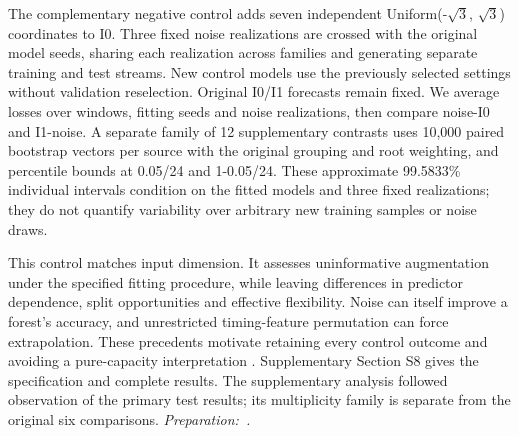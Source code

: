 The complementary negative control adds seven independent Uniform(-\(\sqrt{3}\), \(\sqrt{3}\)) coordinates to I0. Three fixed noise realizations are crossed with the original model seeds, sharing each realization across families and generating separate training and test streams. New control models use the previously selected settings without validation reselection. Original I0/I1 forecasts remain fixed. We average losses over windows, fitting seeds and noise realizations, then compare noise-I0 and I1-noise. A separate family of 12 supplementary contrasts uses 10,000 paired bootstrap vectors per source with the original grouping and root weighting, and percentile bounds at 0.05/24 and 1-0.05/24. These approximate 99.5833\% individual intervals condition on the fitted models and three fixed realizations; they do not quantify variability over arbitrary new training samples or noise draws.

This control matches input dimension. It assesses uninformative augmentation under the specified fitting procedure, while leaving differences in predictor dependence, split opportunities and effective flexibility. Noise can itself improve a forest's accuracy, and unrestricted timing-feature permutation can force extrapolation. These precedents motivate retaining every control outcome and avoiding a pure-capacity interpretation \cite{mentch2022,hooker2021}. Supplementary Section S8 gives the specification and complete results. The supplementary analysis followed observation of the primary test results; its multiplicity family is separate from the original six comparisons. {\small\textit{Preparation:~\cite{openai2026}.}}
